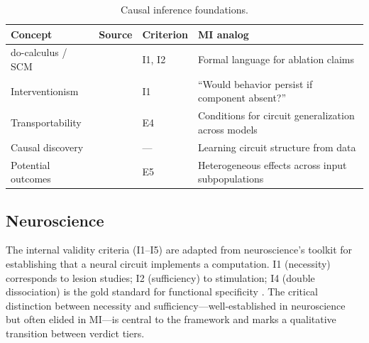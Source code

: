 \documentclass[10pt]{article}
\begin{document}
\begin{table}[H]
\centering\small
\caption{Causal inference foundations.}
\renewcommand{\arraystretch}{1.12}
\begin{tabular}{@{}l>{\raggedright\arraybackslash}p{2.5cm}l>{\raggedright\arraybackslash}p{4.2cm}@{}}
\toprule
\textbf{Concept} & \textbf{Source} & \textbf{Criterion} & \textbf{MI analog} \\
\midrule
do-calculus / SCM & \citet{pearl2009causality} & I1, I2 & Formal language for ablation claims \\
\midrule
Interventionism & \citet{woodward2003making} & I1 & ``Would behavior persist if component absent?'' \\
\midrule
Transportability & \citet{pearl2011transportability} & E4 & Conditions for circuit generalization across models \\
\midrule
Causal discovery & \citet{spirtes2000causation} & --- & Learning circuit structure from data \\
\midrule
Potential outcomes & \citet{rubin1974estimating} & E5 & Heterogeneous effects across input subpopulations \\
\bottomrule
\end{tabular}
\end{table}


\subsection{Neuroscience}
\label{sec:neuro}

The internal validity criteria (I1--I5) are adapted from neuroscience's toolkit for establishing that a neural circuit implements a computation. I1 (necessity) corresponds to lesion studies; I2 (sufficiency) to stimulation; I4 (double dissociation) is the gold standard for functional specificity \citep{woodward2003making}. The critical distinction between necessity and sufficiency---well-established in neuroscience but often elided in MI---is central to the framework and marks a qualitative transition between verdict tiers.
\end{document}
